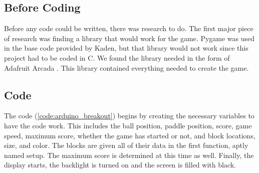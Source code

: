 \documentclass[12pt]{article}
\begin{document}
\subsection{Before Coding}
Before any code could be written, there was research to do. The first major piece of research was finding a library that would work for the game. Pygame was used in the base code provided by Kaden, but that library would not work since this project had to be coded in C. We found the library needed in the form of Adafruit Arcada \cite{Arcada}. This library contained everything needed to create the game.

\subsection{Code}
The code (\ref{code:arduino_breakout}) begins by creating the necessary variables to have the code work. This includes the ball position, paddle position, score, game speed, maximum score, whether the game has started or not, and block locations, size, and color. The blocks are given all of their data in the first function, aptly named setup. The maximum score is determined at this time as well. Finally, the display starts, the backlight is turned on and the screen is filled with black.
\end{document}
